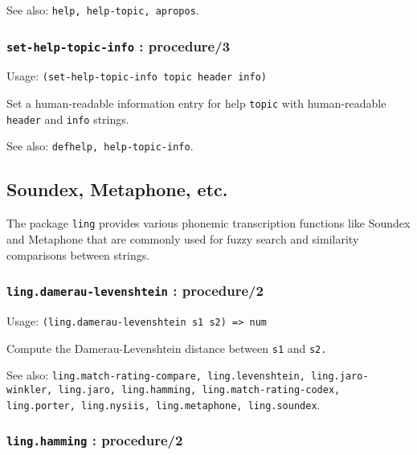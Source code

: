 \documentclass[
]{article}
\newcommand{\passthrough}[1]{#1}
\begin{document}
See also: \passthrough{\lstinline!help, help-topic, apropos!}.

\hypertarget{set-help-topic-info-procedure3}{%
\subsubsection{\texorpdfstring{\texttt{set-help-topic-info} :
procedure/3}{set-help-topic-info : procedure/3}}\label{set-help-topic-info-procedure3}}

Usage: \passthrough{\lstinline!(set-help-topic-info topic header info)!}

Set a human-readable information entry for help
\passthrough{\lstinline!topic!} with human-readable
\passthrough{\lstinline!header!} and \passthrough{\lstinline!info!}
strings.

See also: \passthrough{\lstinline!defhelp, help-topic-info!}.

\hypertarget{soundex-metaphone-etc.}{%
\subsection{Soundex, Metaphone, etc.}\label{soundex-metaphone-etc.}}

The package \passthrough{\lstinline!ling!} provides various phonemic
transcription functions like Soundex and Metaphone that are commonly
used for fuzzy search and similarity comparisons between strings.

\hypertarget{ling.damerau-levenshtein-procedure2}{%
\subsubsection{\texorpdfstring{\texttt{ling.damerau-levenshtein} :
procedure/2}{ling.damerau-levenshtein : procedure/2}}\label{ling.damerau-levenshtein-procedure2}}

Usage: \passthrough{\lstinline!(ling.damerau-levenshtein s1 s2) => num!}

Compute the Damerau-Levenshtein distance between
\passthrough{\lstinline!s1!} and \passthrough{\lstinline!s2.!}

See also:
\passthrough{\lstinline!ling.match-rating-compare, ling.levenshtein, ling.jaro-winkler, ling.jaro, ling.hamming, ling.match-rating-codex, ling.porter, ling.nysiis, ling.metaphone, ling.soundex!}.

\hypertarget{ling.hamming-procedure2}{%
\subsubsection{\texorpdfstring{\texttt{ling.hamming} :
procedure/2}{ling.hamming : procedure/2}}\label{ling.hamming-procedure2}}
\end{document}

